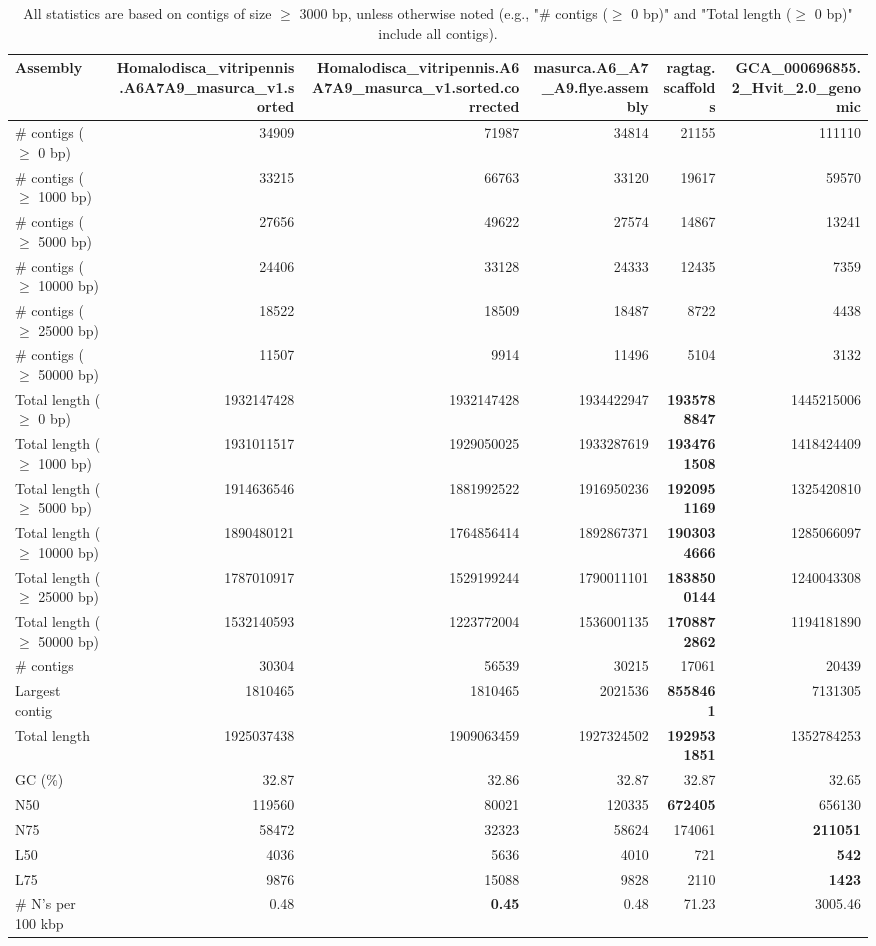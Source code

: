 \documentclass[12pt,a4paper]{article}
\begin{document}
\begin{table}[ht]
\begin{center}
\caption{All statistics are based on contigs of size $\geq$ 3000 bp, unless otherwise noted (e.g., "\# contigs ($\geq$ 0 bp)" and "Total length ($\geq$ 0 bp)" include all contigs).}
\begin{tabular}{|l*{5}{|r}|}
\hline
Assembly & Homalodisca\_vitripennis.A6A7A9\_masurca\_v1.sorted & Homalodisca\_vitripennis.A6A7A9\_masurca\_v1.sorted.corrected & masurca.A6\_A7\_A9.flye.assembly & ragtag.scaffolds & GCA\_000696855.2\_Hvit\_2.0\_genomic \\ \hline
\# contigs ($\geq$ 0 bp) & 34909 & 71987 & 34814 & 21155 & 111110 \\ \hline
\# contigs ($\geq$ 1000 bp) & 33215 & 66763 & 33120 & 19617 & 59570 \\ \hline
\# contigs ($\geq$ 5000 bp) & 27656 & 49622 & 27574 & 14867 & 13241 \\ \hline
\# contigs ($\geq$ 10000 bp) & 24406 & 33128 & 24333 & 12435 & 7359 \\ \hline
\# contigs ($\geq$ 25000 bp) & 18522 & 18509 & 18487 & 8722 & 4438 \\ \hline
\# contigs ($\geq$ 50000 bp) & 11507 & 9914 & 11496 & 5104 & 3132 \\ \hline
Total length ($\geq$ 0 bp) & 1932147428 & 1932147428 & 1934422947 & {\bf 1935788847} & 1445215006 \\ \hline
Total length ($\geq$ 1000 bp) & 1931011517 & 1929050025 & 1933287619 & {\bf 1934761508} & 1418424409 \\ \hline
Total length ($\geq$ 5000 bp) & 1914636546 & 1881992522 & 1916950236 & {\bf 1920951169} & 1325420810 \\ \hline
Total length ($\geq$ 10000 bp) & 1890480121 & 1764856414 & 1892867371 & {\bf 1903034666} & 1285066097 \\ \hline
Total length ($\geq$ 25000 bp) & 1787010917 & 1529199244 & 1790011101 & {\bf 1838500144} & 1240043308 \\ \hline
Total length ($\geq$ 50000 bp) & 1532140593 & 1223772004 & 1536001135 & {\bf 1708872862} & 1194181890 \\ \hline
\# contigs & 30304 & 56539 & 30215 & 17061 & 20439 \\ \hline
Largest contig & 1810465 & 1810465 & 2021536 & {\bf 8558461} & 7131305 \\ \hline
Total length & 1925037438 & 1909063459 & 1927324502 & {\bf 1929531851} & 1352784253 \\ \hline
GC (\%) & 32.87 & 32.86 & 32.87 & 32.87 & 32.65 \\ \hline
N50 & 119560 & 80021 & 120335 & {\bf 672405} & 656130 \\ \hline
N75 & 58472 & 32323 & 58624 & 174061 & {\bf 211051} \\ \hline
L50 & 4036 & 5636 & 4010 & 721 & {\bf 542} \\ \hline
L75 & 9876 & 15088 & 9828 & 2110 & {\bf 1423} \\ \hline
\# N's per 100 kbp & 0.48 & {\bf 0.45} & 0.48 & 71.23 & 3005.46 \\ \hline
\end{tabular}
\end{center}
\end{table}
\end{document}
